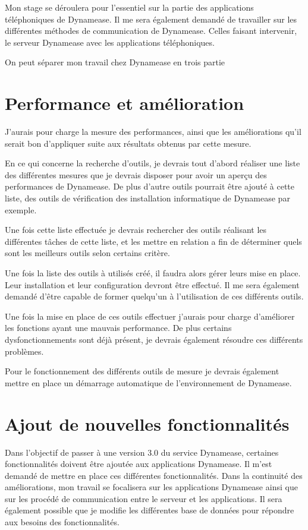 Mon stage se déroulera pour l'essentiel sur la partie des applications téléphoniques de Dynamease. Il me sera également demandé de travailler sur les différentes méthodes de communication de Dynamease. Celles faisant intervenir, le serveur Dynamease avec les applications téléphoniques.

On peut séparer mon travail chez Dynamease en trois partie 

\section{Performance et amélioration}

J'aurais pour charge la mesure des performances, ainsi que les améliorations qu'il serait bon d'appliquer suite aux résultats obtenus par cette mesure. 

En ce qui concerne la recherche d'outils, je devrais tout d'abord réaliser une liste des différentes mesures que je devrais disposer pour avoir un aperçu des performances de Dynamease. De plus d'autre outils pourrait être ajouté à cette liste, des outils de vérification des installation informatique de Dynamease par exemple.

Une fois cette liste effectuée je devrais rechercher des outils réalisant les différentes tâches de cette liste, et les mettre en relation a fin de déterminer quels sont les meilleurs outils selon certains critère.

Une fois la liste des outils à utilisés créé, il faudra alors gérer leurs mise en place. Leur installation et leur configuration devront être effectué. Il me sera également demandé d'être capable de former quelqu'un à l'utilisation de ces différents outils.

Une fois la mise en place de ces outils effectuer j'aurais pour charge d'améliorer les fonctions ayant une mauvais performance. De plus certains dysfonctionnements sont déjà présent, je devrais également résoudre ces différents problèmes.

Pour le fonctionnement des différents outils de mesure je devrais également mettre en place un démarrage automatique de l'environnement de Dynamease.

\section{Ajout de nouvelles fonctionnalités}

Dans l'objectif de passer à une version 3.0 du service Dynamease, certaines fonctionnalités doivent être ajoutée aux applications Dynamease. Il m'est demandé de mettre en place ces différentes fonctionnalités. Dans la continuité des améliorations, mon travail se focalisera sur les applications Dynamease ainsi que sur les procédé de communication entre le serveur et les applications. Il sera également possible que je modifie les différentes base de données pour répondre aux besoins des fonctionnalités.

